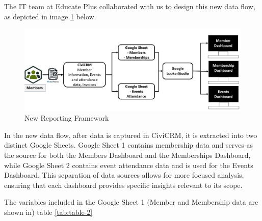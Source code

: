 \documentclass[11pt,a4paper,]{article}
\begin{document}
The IT team at Educate Plus collaborated with us to design this new data flow, as depicted in image \ref{fig:new-framework} below.

\begin{figure}[H]

{\centering \includegraphics[width=0.9\linewidth]{Images/new_reporting_framework} 

}

\caption{New Reporting Framework}\label{fig:new-framework}
\end{figure}

In the new data flow, after data is captured in CiviCRM, it is extracted into two distinct Google Sheets. Google Sheet 1 contains membership data and serves as the source for both the Members Dashboard and the Memberships Dashboard, while Google Sheet 2 contains event attendance data and is used for the Events Dashboard. This separation of data sources allows for more focused analysis, ensuring that each dashboard provides specific insights relevant to its scope.

The variables included in the Google Sheet 1 (Member and Membership data are shown in) table \ref{tab:table-2}
\end{document}
